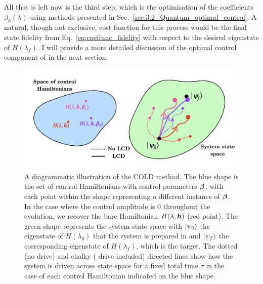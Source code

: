All that is left now is the third  step, which is the optimisation of the coefficients $\beta_k(\lambda)$ using  methods presented in Sec.~\ref{sec:3.2_Quantum_optimal_control}. A natural, though not exclusive, cost function for this process would be the final state fidelity from Eq.~\eqref{eq:costfunc_fidelity} with respect to the desired eigenstate of $H(\lambda_f)$. I will provide a more detailed discussion of the optimal control component of  in the next section.

\begin{figure}[t]
    \centering
    \includegraphics[width=0.8\linewidth]{images/COLD_illustration.png} \caption[A diagrammatic illustration of the COLD method]{A diagrammatic illustration of the COLD method. The blue shape is the set of control Hamiltonians with control parameters $\boldsymbol{\beta}$, with each point within the shape representing a different instance of $\boldsymbol{\beta}$. In the case where the control amplitude is $0$ throughout the evolution, we recover the bare Hamiltonian $H(\lambda, \boldsymbol{h})$ (red point). The green shape represents the system state space with $\ket{\psi_0}$ the eigenstate of $H(\lambda_0)$ that the system is prepared in and $\ket{\psi_f}$ the corresponding eigenstate of $H(\lambda_f)$, which is the target. The dotted (no  drive) and chalky ( drive included) directed lines show how the system is driven across state space for a fixed total time $\tau$ in the case of each control Hamiltonian indicated on the blue shape.}\label{fig:COLD_illustration}
\end{figure}

